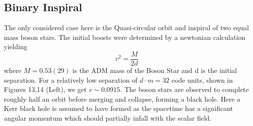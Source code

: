 \documentclass[11pt, oneside]{report}  %
\numberwithin{equation}{section}
\begin{document}
\subsection{Binary Inspiral}
The only considered case here is the Quasi-circular orbit and inspiral of two equal mass boson stars. The initial boosts were determined by a newtonian calculation yielding 
\begin{equation} v^2 = \frac{M}{2d}\end{equation}
where $M=0.53(29)$ is the ADM mass of the Boson Star and d is the initial separation. For a relatively low separation of $d\cdot m =32$ code units, shown in Figures 13,14 (Left), we get $v \sim 0.0915$. The boson stars are observed to complete roughly half an orbit before merging and collapse, forming a black hole. Here a Kerr black hole is assumed to have formed as the spacetime has a significant angular momentum which should partially infall with the scalar field. 
\end{document}
